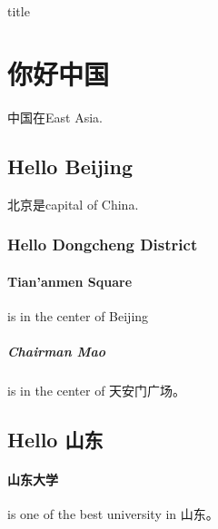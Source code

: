 \documentclass[UTF8]{ctexart}
\begin{document}
	\begin{center}
		{\large title}
	\end{center}
	\section{你好中国}
	中国在East Asia.
	\subsection{Hello Beijing}
	北京是capital of China.
	\subsubsection{Hello Dongcheng District}
	\paragraph{Tian'anmen Square}
	is in the center of Beijing
	\subparagraph{Chairman Mao}
	is in the center of 天安门广场。
	\subsection{Hello 山东}
	\paragraph{山东大学} is one of the best university in 山东。
	
\end{document}
